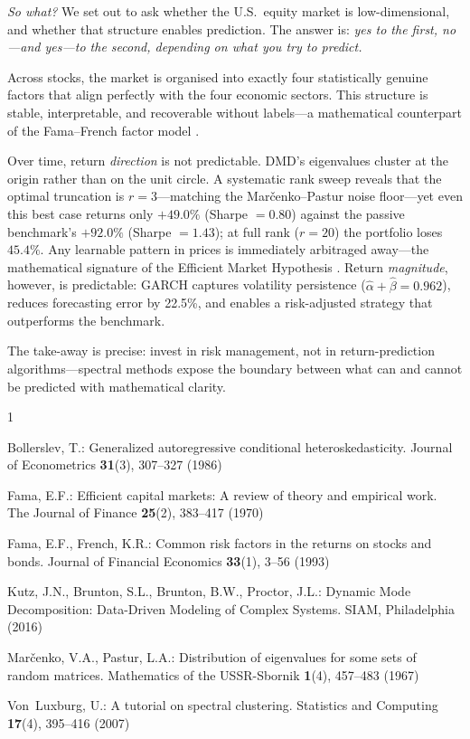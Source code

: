 \documentclass[runningheads]{llncs}
\begin{document}
\emph{So what?}
We set out to ask whether the U.S.\ equity market is low-dimensional, and whether
that structure enables prediction.
The answer is: \emph{yes to the first, no—and yes—to the second, depending on
what you try to predict.}

Across stocks, the market is organised into exactly four statistically genuine
factors that align perfectly with the four economic sectors.
This structure is stable, interpretable, and recoverable without labels—a
mathematical counterpart of the Fama--French factor model \citep{fama1993common}.

Over time, return \emph{direction} is not predictable.
DMD's eigenvalues cluster at the origin rather than on the unit circle.
A systematic rank sweep reveals that the optimal truncation is $r=3$—matching
the Mar\v{c}enko--Pastur noise floor—yet even this best case returns only
$+49.0\%$ (Sharpe $=0.80$) against the passive benchmark's $+92.0\%$
(Sharpe $=1.43$); at full rank ($r=20$) the portfolio loses $45.4\%$.
Any learnable pattern in prices is immediately arbitraged away—the mathematical
signature of the Efficient Market Hypothesis \citep{fama1970efficient}.
Return \emph{magnitude}, however, is predictable: GARCH captures volatility
persistence ($\hat\alpha+\hat\beta=0.962$), reduces forecasting error by 22.5\%,
and enables a risk-adjusted strategy that outperforms the benchmark.

The take-away is precise: invest in risk management, not in return-prediction
algorithms—spectral methods expose the boundary between what can and cannot
be predicted with mathematical clarity.

\begin{thebibliography}{1}
\providecommand{\url}[1]{\texttt{#1}}
\providecommand{\urlprefix}{URL }
\providecommand{\doi}[1]{https://doi.org/#1}

Bollerslev, T.: Generalized autoregressive conditional heteroskedasticity.
  Journal of Econometrics  \textbf{31}(3),  307--327 (1986)

Fama, E.F.: Efficient capital markets: {A} review of theory and empirical work.
  The Journal of Finance  \textbf{25}(2),  383--417 (1970)

Fama, E.F., French, K.R.: Common risk factors in the returns on stocks and
  bonds. Journal of Financial Economics  \textbf{33}(1),  3--56 (1993)

Kutz, J.N., Brunton, S.L., Brunton, B.W., Proctor, J.L.: Dynamic Mode
  Decomposition: Data-Driven Modeling of Complex Systems. SIAM, Philadelphia
  (2016)

Mar{\v{c}}enko, V.A., Pastur, L.A.: Distribution of eigenvalues for some sets
  of random matrices. Mathematics of the USSR-Sbornik  \textbf{1}(4),  457--483
  (1967)

Von~Luxburg, U.: A tutorial on spectral clustering. Statistics and Computing
  \textbf{17}(4),  395--416 (2007)

\end{thebibliography}
\end{document}
